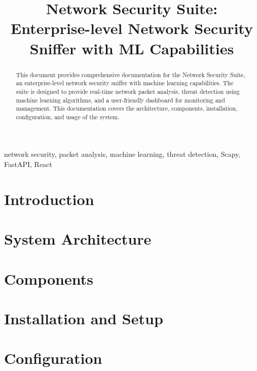 \documentclass[conference]{IEEEtran}
\begin{document}
\title{Network Security Suite: Enterprise-level Network Security Sniffer with ML Capabilities}

\author{
}

\maketitle

\begin{abstract}
This document provides comprehensive documentation for the Network Security Suite, an enterprise-level network security sniffer with machine learning capabilities. The suite is designed to provide real-time network packet analysis, threat detection using machine learning algorithms, and a user-friendly dashboard for monitoring and management. This documentation covers the architecture, components, installation, configuration, and usage of the system.
\end{abstract}

\begin{IEEEkeywords}
network security, packet analysis, machine learning, threat detection, Scapy, FastAPI, React
\end{IEEEkeywords}

\section{Introduction}


\section{System Architecture}


\section{Components}


\section{Installation and Setup}


\section{Configuration}

\end{document}

